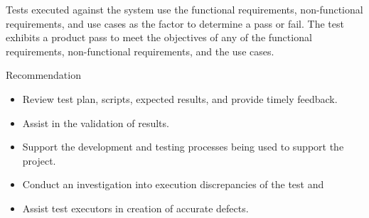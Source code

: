 Tests executed against the system use the functional requirements, non-functional requirements, and use cases as the factor to determine a pass or fail.
The test exhibits a product pass to meet the objectives of any of the functional requirements, non-functional requirements, and the use cases.

Recommendation
\begin{itemize}
	\item Review test plan, scripts, expected results, and provide timely feedback. 
	\item Assist in the validation of results.
	\item Support the development and testing processes being used to support the project.
	\item Conduct an investigation into execution discrepancies of the test and
	\item Assist test executors in creation of accurate defects.
\end{itemize}